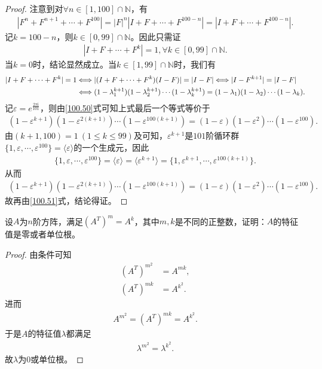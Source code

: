 \documentclass[../../main.tex]{subfiles}%
\begin{document}
\begin{proof}
注意到对$\forall n\in [1,100]\cap \mathbb{N}$，有
\begin{align*}
|F^n + F^{n + 1} + \cdots + F^{100}| = |F|^n|I + F + \cdots + F^{100 - n}| = |I + F + \cdots + F^{100 - n}|.
\end{align*}
记$k = 100 - n$，则$k\in [0,99]\cap \mathbb{N}$。因此只需证
\begin{align*}
|I + F + \cdots + F^k| = 1,\forall k\in [0,99]\cap \mathbb{N}.
\end{align*}
当$k = 0$时，结论显然成立。当$k\in [1,99]\cap \mathbb{N}$时，我们有
\begin{align}
|I + F + \cdots + F^k| = 1 &\Longleftrightarrow |(I + F + \cdots + F^k)(I - F)| = |I - F| \Longleftrightarrow |I - F^{k + 1}| = |I - F| \notag \\
&\Longleftrightarrow (1 - \lambda_1^{k + 1})(1 - \lambda_2^{k + 1})\cdots (1 - \lambda_k^{k + 1}) = (1 - \lambda_1)(1 - \lambda_2)\cdots (1 - \lambda_k). \label{100.51}
\end{align}
记$\varepsilon = e^{\frac{2\pi \mathrm{i}}{101}}$，则由\eqref{100.50}式可知上式最后一个等式等价于
\begin{align*}
(1 - \varepsilon^{k + 1})(1 - \varepsilon^{2(k + 1)})\cdots (1 - \varepsilon^{100(k + 1)}) = (1 - \varepsilon)(1 - \varepsilon^2)\cdots (1 - \varepsilon^{100}).
\end{align*}
由$(k + 1,100) = 1\ (1\leqslant k\leqslant 99)$及可知，$\varepsilon^{k + 1}$是$101$阶循环群$\{1,\varepsilon,\cdots,\varepsilon^{100}\} = \langle \varepsilon \rangle$的一个生成元，因此
\begin{align*}
\{1,\varepsilon,\cdots,\varepsilon^{100}\} = \langle \varepsilon \rangle = \langle \varepsilon^{k + 1} \rangle = \{1,\varepsilon^{k + 1},\cdots,\varepsilon^{100(k + 1)}\}.
\end{align*}
从而
\begin{align*}
(1 - \varepsilon^{k + 1})(1 - \varepsilon^{2(k + 1)})\cdots (1 - \varepsilon^{100(k + 1)}) = (1 - \varepsilon)(1 - \varepsilon^2)\cdots (1 - \varepsilon^{100}).
\end{align*}
故再由\eqref{100.51}式，结论得证。 

\end{proof}

\begin{example}
设$A$为$n$阶方阵，满足$(A^T)^m = A^k$，其中$m,k$是不同的正整数，证明：$A$的特征值是零或者单位根。 
\end{example}
\begin{proof}

由条件可知
\begin{align*}
(A^T)^{m^2}&=A^{mk},\\
(A^T)^{mk}&=A^{k^2}.
\end{align*}
进而
\begin{align*}
A^{m^2}=(A^T)^{mk}=A^{k^2}.
\end{align*}
于是$A$的特征值$\lambda$都满足
\begin{align*}
\lambda^{m^2}=\lambda^{k^2}.
\end{align*}
故$\lambda$为$0$或单位根。 

\end{proof}
\end{document}
